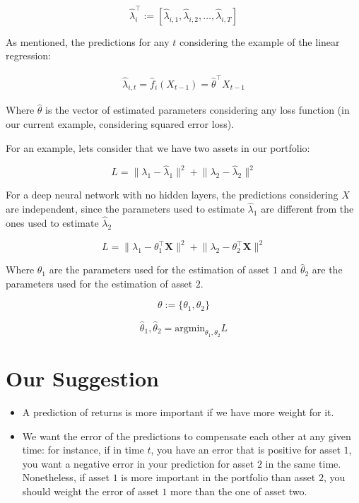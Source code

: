 \documentclass{article}
\begin{document}
$$
\hat{\lambda}_i^{\top} := \left[ \hat{\lambda}_{i, 1}, \hat{\lambda}_{i, 2}, \ldots, \hat{\lambda}_{i, T} \right]
$$

As mentioned, the predictions for any $t$ considering the example of the linear regression:

\begin{align*}
    \hat{\lambda}_{i, t} = \hat{f}_i(X_{t-1}) = \hat{\theta}^{\top} X_{t-1}
\end{align*}

Where $\hat{\theta}$ is the vector of estimated parameters considering any loss function (in our current example, considering squared error loss).

For an example, lets consider that we have two assets in our portfolio:

$$
L = \lVert \lambda_1 - \hat{\lambda}_1 \rVert^2 + \lVert \lambda_2 - \hat{\lambda}_2 \rVert^2
$$

For a deep neural network with no hidden layers, the predictions considering $X$ are independent, since the parameters used to estimate $\hat{\lambda}_1$ are different from the ones used to estimate $\hat{\lambda}_2$ 

$$
L = \lVert \lambda_1 - \theta_{1}^{\top} \mathbf{X} \rVert^2 + \lVert \lambda_2 - \theta_{2}^{\top} \mathbf{X} \rVert^2
$$

Where $\theta_{1}$ are the parameters used for the estimation of asset $1$ and $\hat{\theta}_{2}$ are the parameters used for the estimation of asset $2$.

$$
\theta := \{ \theta_1, \theta_2 \}
$$

$$
\hat{\theta}_1, \hat{\theta}_2 = \text{argmin}_{\theta_1, \theta_2} L
$$

\section{Our Suggestion}

\begin{itemize}
    \item A prediction of returns is more important if we have more weight for it.
    \item We want the error of the predictions to compensate each other at any given time: for instance, if in time $t$, you have an error that is positive for asset $1$, you want a negative error in your prediction for asset $2$ in the same time. Nonetheless, if asset $1$ is more important in the portfolio than asset $2$, you should weight the error of asset $1$ more than the one of asset two.
\end{itemize}
\end{document}
